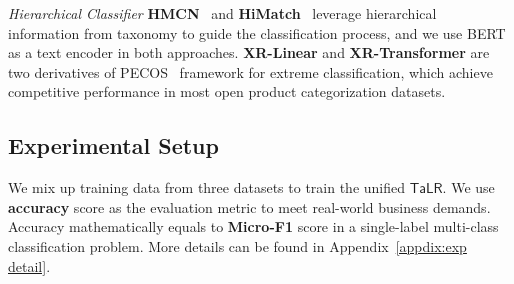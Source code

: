 \textit{Hierarchical Classifier} \textbf{HMCN}~\cite{wehrmann2018hierarchical} and \textbf{HiMatch}~\cite{chen2021hierarchy} leverage hierarchical information from taxonomy to 
guide the classification process, and we use BERT as a text encoder in both approaches. 
\textbf{XR-Linear} and \textbf{XR-Transformer} are two derivatives of PECOS~\cite{yu2020pecos} framework for extreme classification, which achieve competitive performance in most open product categorization datasets.



\subsection{Experimental Setup}
We mix up training data from three datasets to train the unified $\mathsf{TaLR}$. 
We use \textbf{accuracy} score as the evaluation metric to meet real-world business demands.
Accuracy mathematically equals to \textbf{Micro-F1} score in a single-label multi-class classification problem. More details can be found in Appendix~\ref{appdix:exp detail}.

